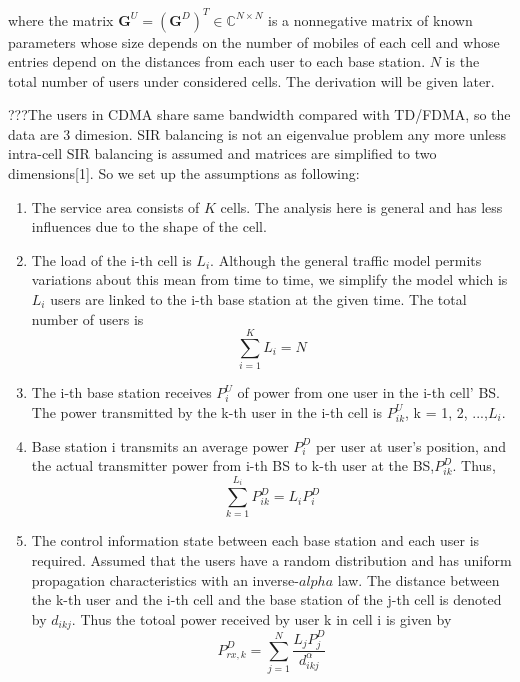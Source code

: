 \documentclass[conference]{IEEEtran}
\begin{document}
where the matrix $\bm{G}^U = (\bm{G}^D)^T\in \mathbb{C}^{N\times N}$ is a nonnegative matrix of known parameters whose size depends on the number of mobiles of each cell and whose entries depend on the distances from each user to each base station. $N$ is the total number of users under considered cells. The derivation will be given later.

{\color{red}???The users in CDMA share same bandwidth compared with TD/FDMA, so the data are 3 dimesion.}  SIR balancing is not an eigenvalue problem any more unless intra-cell SIR balancing is assumed and  matrices are simplified to two dimensions[1]. So we set up the assumptions as following:              
\vspace*{3mm}
\begin{enumerate}
	\item The service area consists of $K$ cells. The analysis here is general and has less influences due to the shape of the cell.
	\item The load of the i-th cell is $L_{i}$. Although the general traffic model permits variations about this mean from time to time, we simplify the model which is $L_{i}$ users are linked to the i-th base station at the given time.
	The total number of users is  
	\begin{equation}
		\sum_{i=1}^{K} L_i = N
	\end{equation}
	\item The i-th base station receives $P^{U}_{i}$ of power from one user in the i-th cell' BS. The power transmitted by the k-th user in the i-th cell is $P^{U}_{ik}$, k = 1, 2, ...,$L_{i}$. 
	\item Base station i transmits an average power $P^{D}_{i}$ per user at user's position, and the actual transmitter power from i-th BS to k-th user at the BS,$P^{D}_{ik}$. Thus,
	\begin{equation}
	\sum_{k=1}^{L_i} P^{D}_{ik} = L_iP_i^D
	\end{equation}
	\item The control information state between each base station and each user is required. Assumed that the users have a random distribution and has uniform propagation characteristics with an inverse-$alpha$ law. The distance between the k-th user and the i-th cell and the base station of the j-th cell is denoted by $d_{ikj}$. Thus the totoal power received by user k in cell i is given by
	\begin{equation}
	 P_{rx,k}^D = \sum^N_{j=1} \frac{L_jP_j^D}{d^\alpha_{ikj}}
	\end{equation}
\end{enumerate}
\end{document}
